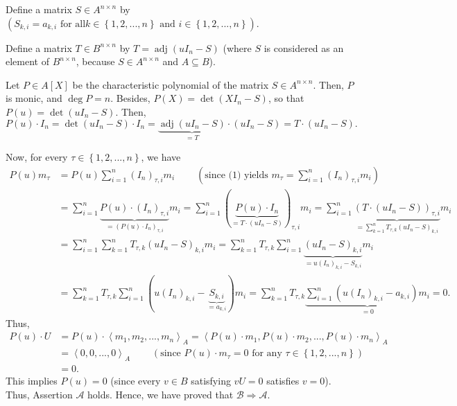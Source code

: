 \documentclass[12pt,final,notitlepage,onecolumn]{article}%
\begin{document}
Define a matrix $S\in A^{n\times n}$ by $\left(  S_{k,i}=a_{k,i}\text{ for all
}k\in\left\{  1,2,...,n\right\}  \text{ and }i\in\left\{  1,2,...,n\right\}
\right)  $.

Define a matrix $T\in B^{n\times n}$ by $T=\operatorname{adj}\left(
uI_{n}-S\right)  $ (where $S$ is considered as an element of $B^{n\times n}$,
because $S\in A^{n\times n}$ and $A\subseteq B$).

Let $P\in A\left[  X\right]  $ be the characteristic polynomial of the matrix
$S\in A^{n\times n}$. Then, $P$ is monic, and $\deg P=n$. Besides, $P\left(
X\right)  =\det\left(  XI_{n}-S\right)  $, so that $P\left(  u\right)
=\det\left(  uI_{n}-S\right)  $. Then,%
\[
P\left(  u\right)  \cdot I_{n}=\det\left(  uI_{n}-S\right)  \cdot
I_{n}=\underbrace{\operatorname{adj}\left(  uI_{n}-S\right)  }_{=T}%
\cdot\left(  uI_{n}-S\right)  =T\cdot\left(  uI_{n}-S\right)  .
\]


Now, for every $\tau\in\left\{  1,2,...,n\right\}  $, we have%
\begin{align*}
P\left(  u\right)  m_{\tau}  &  =P\left(  u\right)  \sum\limits_{i=1}%
^{n}\left(  I_{n}\right)  _{\tau,i}m_{i}\ \ \ \ \ \ \ \ \ \ \left(
\text{since (1) yields }m_{\tau}=\sum\limits_{i=1}^{n}\left(  I_{n}\right)
_{\tau,i}m_{i}\right) \\
&  =\sum_{i=1}^{n}\underbrace{P\left(  u\right)  \cdot\left(  I_{n}\right)
_{\tau,i}}_{=\left(  P\left(  u\right)  \cdot I_{n}\right)  _{\tau,i}}%
m_{i}=\sum_{i=1}^{n}\left(  \underbrace{P\left(  u\right)  \cdot I_{n}%
}_{=T\cdot\left(  uI_{n}-S\right)  }\right)  _{\tau,i}m_{i}=\sum_{i=1}%
^{n}\underbrace{\left(  T\cdot\left(  uI_{n}-S\right)  \right)  _{\tau,i}%
}_{=\sum\limits_{k=1}^{n}T_{\tau,k}\left(  uI_{n}-S\right)  _{k,i}}m_{i}\\
&  =\sum_{i=1}^{n}\sum\limits_{k=1}^{n}T_{\tau,k}\left(  uI_{n}-S\right)
_{k,i}m_{i}=\sum\limits_{k=1}^{n}T_{\tau,k}\sum_{i=1}^{n}\underbrace{\left(
uI_{n}-S\right)  _{k,i}}_{=u\left(  I_{n}\right)  _{k,i}-S_{k,i}}m_{i}\\
&  =\sum\limits_{k=1}^{n}T_{\tau,k}\sum_{i=1}^{n}\left(  u\left(
I_{n}\right)  _{k,i}-\underbrace{S_{k,i}}_{=a_{k,i}}\right)  m_{i}%
=\sum\limits_{k=1}^{n}T_{\tau,k}\underbrace{\sum_{i=1}^{n}\left(  u\left(
I_{n}\right)  _{k,i}-a_{k,i}\right)  m_{i}}_{=0}=0.
\end{align*}
Thus,%
\begin{align*}
P\left(  u\right)  \cdot U  &  =P\left(  u\right)  \cdot\left\langle
m_{1},m_{2},...,m_{n}\right\rangle _{A}=\left\langle P\left(  u\right)  \cdot
m_{1},P\left(  u\right)  \cdot m_{2},...,P\left(  u\right)  \cdot
m_{n}\right\rangle _{A}\\
&  =\left\langle 0,0,...,0\right\rangle _{A}\ \ \ \ \ \ \ \ \ \ \left(
\text{since }P\left(  u\right)  \cdot m_{\tau}=0\text{ for any }\tau
\in\left\{  1,2,...,n\right\}  \right) \\
&  =0.
\end{align*}
This implies $P\left(  u\right)  =0$ (since every $v\in B$ satisfying $vU=0$
satisfies $v=0$). Thus, Assertion $\mathcal{A}$ holds. Hence, we have proved
that $\mathcal{B}\Longrightarrow\mathcal{A}$.
\end{document}
